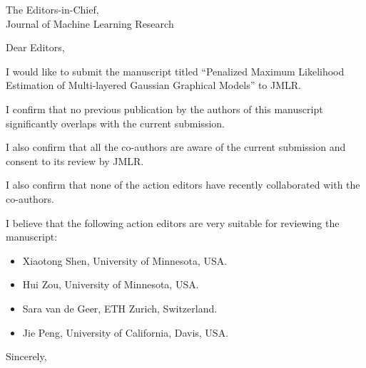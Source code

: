 \documentclass{letter}
\begin{document}
\begin{letter}{The Editors-in-Chief,\\
Journal of Machine Learning Research}
\opening{Dear Editors,}

I would like to submit the manuscript titled  “Penalized Maximum Likelihood Estimation of Multi-layered Gaussian Graphical Models” to JMLR.

I confirm that no previous publication by the authors of this manuscript significantly overlaps with the current submission.

I also confirm that all the co-authors are aware of the current submission and consent to its review by JMLR.

I also confirm that none of the action editors have recently collaborated with the co-authors.

I believe that the following action editors are very suitable for reviewing  the manuscript:

\begin{itemize}
	\item Xiaotong Shen, University of Minnesota, USA.
	\item Hui Zou, University of Minnesota, USA.
	\item Sara van de Geer, ETH Zurich, Switzerland.
	\item Jie Peng, University of California, Davis, USA. 
\end{itemize}
\closing{Sincerely,}
\end{letter}
\end{document}

